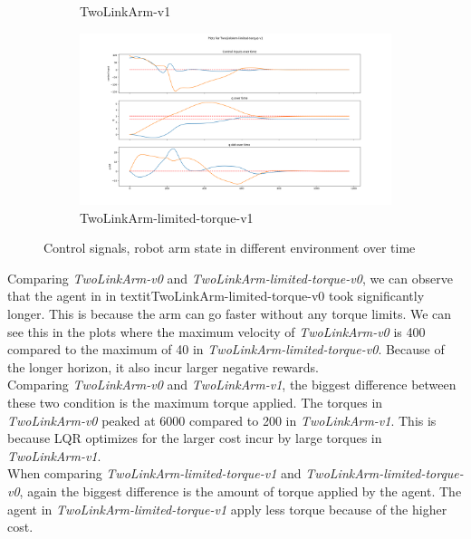 \documentclass[hidelinks]{scrartcl}
\begin{document}
\begin{figure}[H]
\begin{subfigure}[b]{0.45\textwidth}
        \caption{TwoLinkArm-v1}
    \end{subfigure}
    \begin{subfigure}[b]{0.45\textwidth}
        \includegraphics[width=\textwidth]{figures/twolinkarm-limited-v1}
        \caption{TwoLinkArm-limited-torque-v1}
    \end{subfigure}
    \caption{Control signals, robot arm state in different environment over time}\label{fig:LQR_state}
\end{figure}
Comparing \textit{TwoLinkArm-v0} and \textit{TwoLinkArm-limited-torque-v0}, we can observe that the agent in in textit{TwoLinkArm-limited-torque-v0} took significantly longer. This is because the arm can go faster without any torque limits. We can see this in the plots where the maximum velocity of \textit{TwoLinkArm-v0} is 400 compared to the maximum of 40 in \textit{TwoLinkArm-limited-torque-v0}. Because of the longer horizon, it also incur larger negative rewards.\\
Comparing \textit{TwoLinkArm-v0} and \textit{TwoLinkArm-v1}, the biggest difference between these two condition is the maximum torque applied. The torques in \textit{TwoLinkArm-v0} peaked at 6000 compared to 200 in \textit{TwoLinkArm-v1}. This is because LQR optimizes for the larger cost incur by large torques in \textit{TwoLinkArm-v1}.\\
When comparing \textit{TwoLinkArm-limited-torque-v1} and \textit{TwoLinkArm-limited-torque-v0}, again the biggest difference is the amount of torque applied by the agent. The agent in \textit{TwoLinkArm-limited-torque-v1} apply less torque because of the higher cost.
\end{document}
